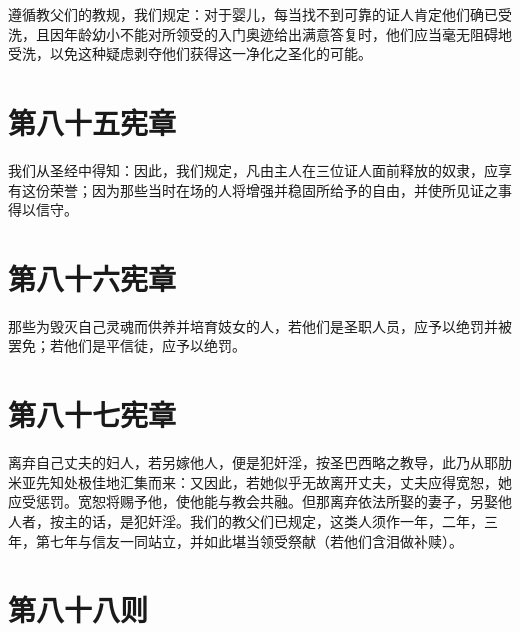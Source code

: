 遵循教父们的教规，我们规定：对于婴儿，每当找不到可靠的证人肯定他们确已受洗，且因年龄幼小不能对所领受的入门奥迹给出满意答复时，他们应当毫无阻碍地受洗，以免这种疑虑剥夺他们获得这一净化之圣化的可能。\par


\section{第八十五宪章}

我们从圣经中得知：因此，我们规定，凡由主人在三位证人面前释放的奴隶，应享有这份荣誉；因为那些当时在场的人将增强并稳固所给予的自由，并使所见证之事得以信守。\par


\section{第八十六宪章}

那些为毁灭自己灵魂而供养并培育妓女的人，若他们是圣职人员，应予以绝罚并被罢免；若他们是平信徒，应予以绝罚。\par


\section{第八十七宪章}

离弃自己丈夫的妇人，若另嫁他人，便是犯奸淫，按圣巴西略之教导，此乃从耶肋米亚先知处极佳地汇集而来：又因此，若她似乎无故离开丈夫，丈夫应得宽恕，她应受惩罚。宽恕将赐予他，使他能与教会共融。但那离弃依法所娶的妻子，另娶他人者，按主的话，是犯奸淫。我们的教父们已规定，这类人须作一年，二年，三年，第七年与信友一同站立，并如此堪当领受祭献（若他们含泪做补赎）。\par


\section{第八十八则}

